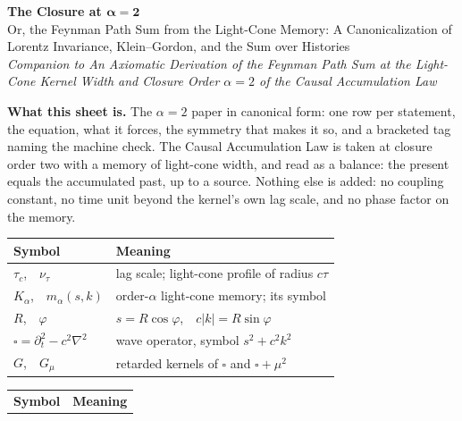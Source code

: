\documentclass[10pt]{article}
\begin{document}
\color{black}
\vspace{0pt}
\begin{center}
{\Large\textbf{The Closure at $\boldsymbol{\alpha=2}$}}\\[3pt]
{\large Or, the Feynman Path Sum from the Light-Cone Memory: A Canonicalization of Lorentz Invariance, Klein--Gordon, and the Sum over Histories}\\[3pt]
\textit{Companion to An Axiomatic Derivation of the Feynman Path Sum at the Light-Cone Kernel Width and Closure Order $\alpha=2$ of the Causal Accumulation Law}
\end{center}
\vspace{1pt}
\begin{sheetbox}
\textbf{What this sheet is.} The $\alpha=2$ paper in canonical form: one row per statement, the equation, what it forces, the symmetry that makes it so, and a bracketed tag naming the machine check. The Causal Accumulation Law is taken at closure order two with a memory of light-cone width, and read as a balance: the present equals the accumulated past, up to a source. Nothing else is added: no coupling constant, no time unit beyond the kernel's own lag scale, and no phase factor on the memory.\par\vspace{3pt}
{\small\renewcommand{\arraystretch}{1.0}\setlength{\tabcolsep}{2.5pt}
\begin{minipage}[t]{0.5\linewidth}
\begin{tabular}[t]{@{}l l@{}}
\toprule
\textbf{Symbol} & \textbf{Meaning}\\
\midrule
$\tau_c$,\ \ $\nu_\tau$ & lag scale; light-cone profile of radius $c\tau$\\
$K_\alpha$,\ \ $m_\alpha(s,k)$ & order-$\alpha$ light-cone memory; its symbol\\
$R$,\ \ $\varphi$ & $s=R\cos\varphi$,\ \ $c|k|=R\sin\varphi$\\
$\square=\partial_t^2-c^2\nabla^2$ & wave operator, symbol $s^2+c^2k^2$\\
$G$,\ \ $G_\mu$ & retarded kernels of $\square$ and $\square+\mu^2$\\
\bottomrule
\end{tabular}
\end{minipage}\hfill
\begin{minipage}[t]{0.47\linewidth}
\begin{tabular}[t]{@{}l l@{}}
\toprule
\textbf{Symbol} & \textbf{Meaning}\\

\end{tabular}
\end{minipage}}
\end{sheetbox}
\end{document}
